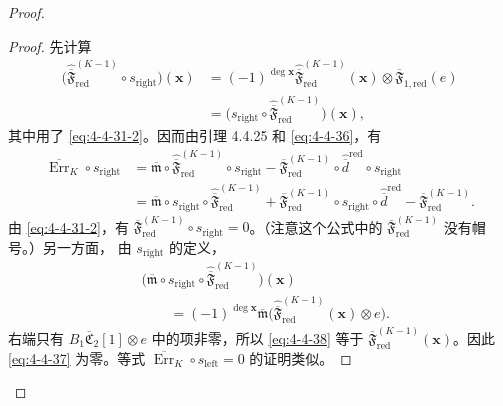 \begin{proof}
\begin{proof}
先计算
\begin{equation}
 \begin{aligned}
 \bigl(
 \widehat{\overline{\mathfrak F}}_{\mathrm{red}}^{(K-1)}
 \circ s_{\mathrm{right}}\bigr)(\mathbf x)
 &={}
 (-1)^{\deg\mathbf x}
 \widehat{\overline{\mathfrak F}}_{\mathrm{red}}^{(K-1)}(\mathbf x)
 \otimes\overline{\mathfrak F}_{1,\mathrm{red}}(e)\\
 &=\bigl(s_{\mathrm{right}}\circ
 \widehat{\overline{\mathfrak F}}_{\mathrm{red}}^{(K-1)}
 \bigr)(\mathbf x),
 \end{aligned}
\tag{4.4.36}\label{eq:4-4-36}
\end{equation}
其中用了 \eqref{eq:4-4-31-2}。因而由引理 4.4.25 和
\eqref{eq:4-4-36}，有
\begin{equation}
 \begin{aligned}
 \overline{\operatorname{Err}}_K\circ s_{\mathrm{right}}
 &={}
 \overline{\mathfrak m}\circ
 \widehat{\overline{\mathfrak F}}_{\mathrm{red}}^{(K-1)}
 \circ s_{\mathrm{right}}
 -\overline{\mathfrak F}_{\mathrm{red}}^{(K-1)}
 \circ\widehat{\overline d}^{\mathrm{red}}
 \circ s_{\mathrm{right}}\\
 &=\overline{\mathfrak m}\circ s_{\mathrm{right}}\circ
 \widehat{\overline{\mathfrak F}}_{\mathrm{red}}^{(K-1)}
 +\overline{\mathfrak F}_{\mathrm{red}}^{(K-1)}
 \circ s_{\mathrm{right}}\circ
 \widehat{\overline d}^{\mathrm{red}}
 -\overline{\mathfrak F}_{\mathrm{red}}^{(K-1)}.
 \end{aligned}
\tag{4.4.37}\label{eq:4-4-37}
\end{equation}
由 \eqref{eq:4-4-31-2}，有
$\overline{\mathfrak F}_{\mathrm{red}}^{(K-1)}
\circ s_{\mathrm{right}}=0$。（注意这个公式中的
$\overline{\mathfrak F}_{\mathrm{red}}^{(K-1)}$ 没有帽号。）另一方面，
由 $s_{\mathrm{right}}$ 的定义，
\begin{equation}
 \begin{aligned}
 &\bigl(
 \overline{\mathfrak m}\circ s_{\mathrm{right}}\circ
 \widehat{\overline{\mathfrak F}}_{\mathrm{red}}^{(K-1)}
 \bigr)(\mathbf x)\\
 &\qquad={}
 (-1)^{\deg\mathbf x}\overline{\mathfrak m}
 \bigl(
 \widehat{\overline{\mathfrak F}}_{\mathrm{red}}^{(K-1)}(\mathbf x)
 \otimes e
 \bigr).
 \end{aligned}
\tag{4.4.38}\label{eq:4-4-38}
\end{equation}
右端只有
$B_1\overline{\mathfrak C}_2[1]\otimes e$ 中的项非零，所以
\eqref{eq:4-4-38} 等于
$\overline{\mathfrak F}_{\mathrm{red}}^{(K-1)}(\mathbf x)$。因此
\eqref{eq:4-4-37} 为零。等式
$\overline{\operatorname{Err}}_K\circ s_{\mathrm{left}}=0$ 的证明类似。
\end{proof}


\end{proof}
